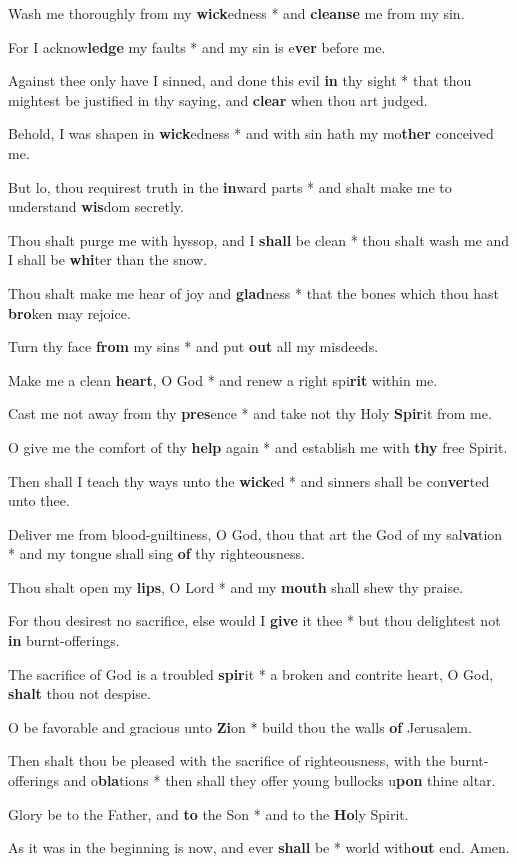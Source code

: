 \begin{multicols}{2}
	Wash me thoroughly from my \textbf{wick}edness * and \textbf{cleanse} me from my sin.
	
	For I acknow\textbf{ledge} my faults * and my sin is e\textbf{ver} before me.
	
	Against thee only have I sinned, and done this evil \textbf{in} thy sight * that thou mightest be justified in thy saying, and \textbf{clear} when thou art judged.
	
	Behold, I was shapen in \textbf{wick}edness * and with sin hath my mo\textbf{ther} conceived me.
	
	But lo, thou requirest truth in the \textbf{in}ward parts * and shalt make me to understand \textbf{wis}dom secretly.
	
	Thou shalt purge me with hyssop, and I \textbf{shall} be clean * thou shalt wash me and I shall be \textbf{whi}ter than the snow.
	
	Thou shalt make me hear of joy and \textbf{glad}ness * that the bones which thou hast \textbf{bro}ken may rejoice.
	
	Turn thy face \textbf{from} my sins * and put \textbf{out} all my misdeeds.
	
	Make me a clean \textbf{heart}, O God * and renew a right spi\textbf{rit} within me.
	
	Cast me not away from thy \textbf{pres}ence * and take not thy Holy \textbf{Spir}it from me.
	
	O give me the comfort of thy \textbf{help} again * and establish me with \textbf{thy} free Spirit.
	
	Then shall I teach thy ways unto the \textbf{wick}ed * and sinners shall be con\textbf{ver}ted unto thee.
	
	Deliver me from blood-guiltiness, O God, thou that art the God of my sal\textbf{va}tion * and my tongue shall sing \textbf{of} thy righteousness.
	
	Thou shalt open my \textbf{lips}, O Lord * and my \textbf{mouth} shall shew thy praise.
	
	For thou desirest no sacrifice, else would I \textbf{give} it thee * but thou delightest not \textbf{in} burnt-offerings.
	
	The sacrifice of God is a troubled \textbf{spir}it * a broken and contrite heart, O God, \textbf{shalt} thou not despise.
	
	O be favorable and gracious unto \textbf{Zi}on * build thou the walls \textbf{of} Jerusalem.
	
	Then shalt thou be pleased with the sacrifice of righteousness, with the burnt-offerings and o\textbf{bla}tions * then shall they offer young bullocks u\textbf{pon} thine altar.
	
	Glory be to the Father, and \textbf{to} the Son * and to the \textbf{Ho}ly Spirit.
	
	As it was in the beginning is now, and ever \textbf{shall} be * world with\textbf{out} end. Amen.
\end{multicols}